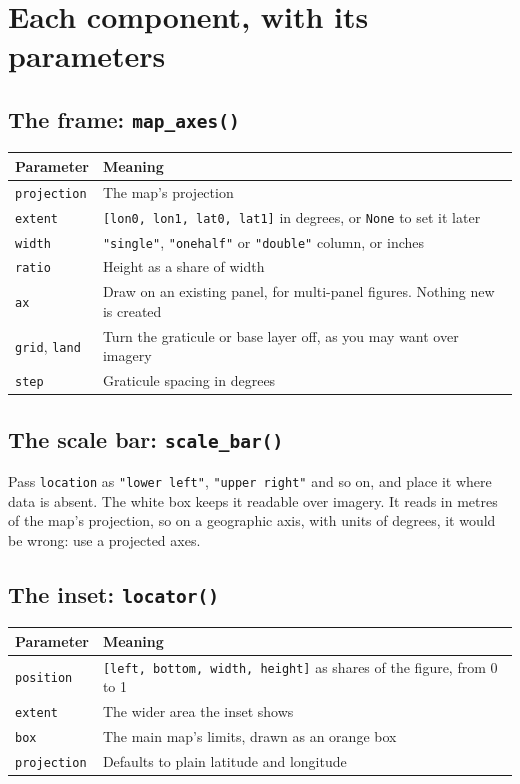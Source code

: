 \chapter{Each component, with its parameters}\label{ch:components}

\section{The frame: \texttt{map\_axes()}}

\begin{tabularx}{\linewidth}{@{}lX@{}}
\toprule
Parameter & Meaning \\
\midrule
\texttt{projection} & The map's projection \\
\texttt{extent} & \texttt{[lon0, lon1, lat0, lat1]} in degrees, or \texttt{None} to set it later \\
\texttt{width} & \texttt{"single"}, \texttt{"onehalf"} or \texttt{"double"} column, or inches \\
\texttt{ratio} & Height as a share of width \\
\texttt{ax} & Draw on an existing panel, for multi-panel figures. Nothing new is created \\
\texttt{grid}, \texttt{land} & Turn the graticule or base layer off, as you may want over imagery \\
\texttt{step} & Graticule spacing in degrees \\
\bottomrule
\end{tabularx}

\section{The scale bar: \texttt{scale\_bar()}}

Pass \texttt{location} as \texttt{"lower left"}, \texttt{"upper right"} and so on, and place it where data is absent. The white box keeps it readable over imagery. It reads in metres of the map's projection, so on a geographic axis, with units of degrees, it would be wrong: use a projected axes.

\section{The inset: \texttt{locator()}}

\begin{tabularx}{\linewidth}{@{}lX@{}}
\toprule
Parameter & Meaning \\
\midrule
\texttt{position} & \texttt{[left, bottom, width, height]} as shares of the figure, from 0 to 1 \\
\texttt{extent} & The wider area the inset shows \\
\texttt{box} & The main map's limits, drawn as an orange box \\
\texttt{projection} & Defaults to plain latitude and longitude \\
\bottomrule
\end{tabularx}

